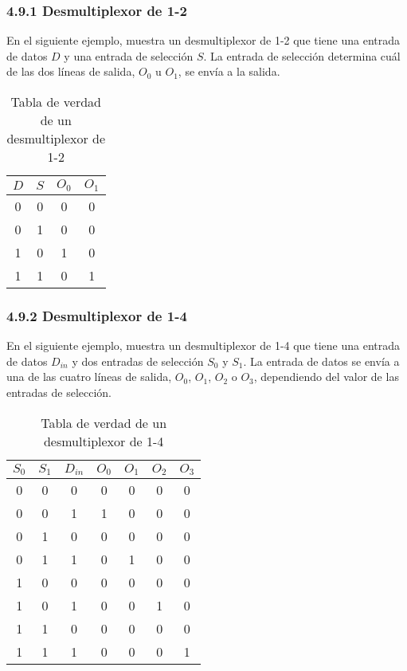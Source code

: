 \subsubsection*{4.9.1 Desmultiplexor de 1-2}
En el siguiente ejemplo, muestra un desmultiplexor de 1-2 que tiene una entrada de datos $D$ y una entrada de selecci\'{o}n $S$.
La entrada de selecci\'{o}n determina cu\'{a}l de las dos l\'{i}neas de salida, $O_0$ u $O_1$, se env\'{i}a a la salida.

\begin{table}[h]
    \centering
    \begin{tabular}{cc|cc}
        \toprule
        $D$ & $S$ & $O_0$ & $O_1$ \\
        \midrule
        0   & 0   & 0     & 0     \\
        0   & 1   & 0     & 0     \\
        1   & 0   & 1     & 0     \\
        1   & 1   & 0     & 1     \\
        \bottomrule
    \end{tabular}
    \caption{Tabla de verdad de un desmultiplexor de 1-2}
\end{table}

\subsubsection*{4.9.2 Desmultiplexor de 1-4}
En el siguiente ejemplo, muestra un desmultiplexor de 1-4 que tiene una entrada de datos $D_{in}$ y dos entradas de selecci\'{o}n $S_0$ y $S_1$.
La entrada de datos se env\'{i}a a una de las cuatro l\'{i}neas de salida, $O_0$, $O_1$, $O_2$ o $O_3$, dependiendo del valor de las entradas de selecci\'{o}n.

\begin{table}[h]
    \centering
    \begin{tabular}{ccc|cccc}
        \toprule
        $S_0$ & $S_1$ & $D_{in}$ & $O_0$ & $O_1$ & $O_2$ & $O_3$ \\
        \midrule
        0     & 0     & 0        & 0     & 0     & 0     & 0     \\
        0     & 0     & 1        & 1     & 0     & 0     & 0     \\
        0     & 1     & 0        & 0     & 0     & 0     & 0     \\
        0     & 1     & 1        & 0     & 1     & 0     & 0     \\
        1     & 0     & 0        & 0     & 0     & 0     & 0     \\
        1     & 0     & 1        & 0     & 0     & 1     & 0     \\
        1     & 1     & 0        & 0     & 0     & 0     & 0     \\
        1     & 1     & 1        & 0     & 0     & 0     & 1     \\
        \bottomrule
    \end{tabular}
    \caption{Tabla de verdad de un desmultiplexor de 1-4}
\end{table}
\newpage


